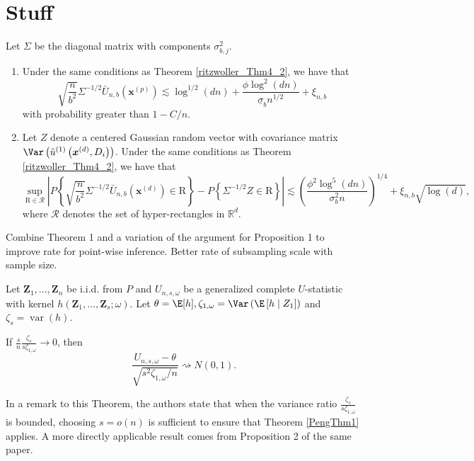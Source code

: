 \section{Stuff}

\begin{thm}
	Let $\Sigma$ be the diagonal matrix with components $\sigma_{b, j}^2$.
	\begin{enumerate}
		\item Under the same conditions as Theorem \ref{ritzwoller_Thm4_2}, we have that
		      \begin{equation}
			      \sqrt{\frac{n}{b^2}} \Sigma^{-1 / 2} \bar{U}_{n, b}\left(\mathbf{x}^{(p)}\right) \lesssim \log ^{1 / 2}(d n)+\frac{\phi \log ^2(d n)}{\underline{\sigma}_b n^{1 / 2}}+\xi_{n, b}
		      \end{equation}
		      with probability greater than $1-C / n$.
		\item Let $Z$ denote a centered Gaussian random vector with covariance matrix $\Var\left(\tilde{u}^{(1)}\left(\boldsymbol{x}^{(d)}, D_i\right)\right)$.
		      Under the same conditions as Theorem \ref{ritzwoller_Thm4_2}, we have that
		      \begin{equation}
			      \sup _{\mathrm{R} \in \mathcal{R}}\left|P\left\{\sqrt{\frac{n}{b^2}} \Sigma^{-1 / 2} \bar{U}_{n, b}\left(\boldsymbol{x}^{(d)}\right) \in \mathrm{R}\right\}-P\left\{\Sigma^{-1 / 2} Z \in \mathrm{R}\right\}\right|
			      \lesssim\left(\frac{\phi^2 \log ^5(d n)}{\sigma_b^2 n}\right)^{1 / 4}+\xi_{n, b} \sqrt{\log (d)},
		      \end{equation}
		      where $\mathcal{R}$ denotes the set of hyper-rectangles in $\mathbb{R}^d$.
	\end{enumerate}
\end{thm}

\citet{peng_rates_2022}
{\color{red} Combine Theorem 1 and a variation of the argument for Proposition 1 to improve rate for point-wise inference.
	Better rate of subsampling scale with sample size.}


\begin{thm}\label{PengThm1}
	Let $\mathbf{Z}_1, \ldots, \mathbf{Z}_n$ be i.i.d. from $P$ and $U_{n, s, \omega}$ be a generalized complete $U$-statistic with kernel $h\left(\mathbf{Z}_1, \ldots, \mathbf{Z}_s ; \omega\right)$.
	Let $\theta=\E[h], \zeta_{1, \omega}=\Var\left(\E\left[h \mid Z_1\right]\right)$ and $\zeta_s=\operatorname{var}(h)$.

	If $\frac{s}{n} \frac{\zeta_s}{s \zeta_{1, \omega}} \rightarrow 0$, then
	\begin{equation}
		\frac{U_{n, s, \omega}-\theta}{\sqrt{s^2 \zeta_{1, \omega} / n}} \rightsquigarrow N(0,1) .
	\end{equation}
\end{thm}
In a remark to this Theorem, the authors state that when the variance ratio $\frac{\zeta_s}{s\zeta_{1,\omega}}$ is bounded, choosing $s = o(n)$ is sufficient to ensure that Theorem \ref{PengThm1} applies.
A more directly applicable result comes from Proposition 2 of the same paper.


